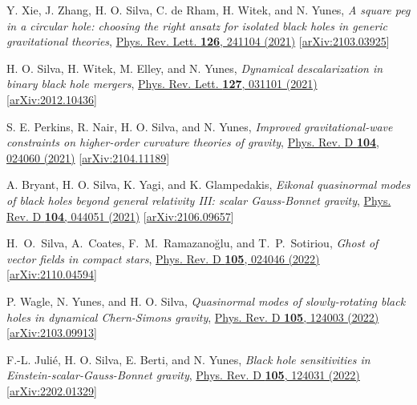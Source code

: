 \documentclass[10pt]{article}
\begin{document}
\begin{bibenum}
    \item Y. Xie, J. Zhang, H. O. Silva, C. de Rham, H. Witek, and N. Yunes,
    \emph{A square peg in a circular hole: choosing the right ansatz for isolated black holes in generic gravitational theories},
    \href{https://journals.aps.org/prl/abstract/10.1103/PhysRevLett.126.241104}{Phys. Rev. Lett. {\bf 126}, 241104 (2021)}
    [\href{https://arxiv.org/abs/2103.03925}{arXiv:2103.03925}]

    \item H. O. Silva, H. Witek, M. Elley, and N. Yunes,
    \emph{Dynamical descalarization in binary black hole mergers},
    \href{https://journals.aps.org/prl/abstract/10.1103/PhysRevLett.127.031101}{Phys. Rev. Lett. {\bf 127}, 031101 (2021)}
    [\href{https://arxiv.org/abs/2012.10436}{arXiv:2012.10436}]

    \item S. E. Perkins, R. Nair, H. O. Silva, and N. Yunes,
    \emph{Improved gravitational-wave constraints on higher-order curvature theories of gravity},
    \href{https://journals.aps.org/prd/abstract/10.1103/PhysRevD.104.024060}{Phys. Rev. D {\bf 104}, 024060 (2021)}
    [\href{https://arxiv.org/abs/2104.11189}{arXiv:2104.11189}]

    \item A. Bryant, H. O. Silva, K. Yagi, and K. Glampedakis,
    \emph{Eikonal quasinormal modes of black holes beyond general relativity III: scalar Gauss-Bonnet gravity},
    \href{https://journals.aps.org/prd/abstract/10.1103/PhysRevD.104.044051}{Phys. Rev. D {\bf 104}, 044051 (2021)}
    [\href{https://arxiv.org/abs/2106.09657}{arXiv:2106.09657}]

    \item H.~O.~Silva, A.~Coates, F.~M.~Ramazano\u{g}lu, and T.~P.~Sotiriou,
    \emph{Ghost of vector fields in compact stars},
    \href{https://journals.aps.org/prd/abstract/10.1103/PhysRevD.105.024046}{Phys. Rev. D {\bf 105}, 024046 (2022)}
    [\href{https://arxiv.org/abs/2110.04594}{arXiv:2110.04594}]

    \item P. Wagle, N. Yunes, and H. O. Silva,
    \emph{Quasinormal modes of slowly-rotating black holes in dynamical Chern-Simons gravity},
    \href{https://journals.aps.org/prd/abstract/10.1103/PhysRevD.105.124003}{Phys. Rev. D {\bf 105}, 124003 (2022)}
    [\href{https://arxiv.org/abs/2103.09913}{arXiv:2103.09913}]

    \item F.-L. Juli\'e, H. O. Silva, E. Berti, and N. Yunes,
    \emph{Black hole sensitivities in Einstein-scalar-Gauss-Bonnet gravity},
    \href{https://journals.aps.org/prd/abstract/10.1103/PhysRevD.105.124031}{Phys. Rev. D {\bf 105}, 124031 (2022)}
    [\href{https://arxiv.org/abs/2202.01329}{arXiv:2202.01329}]


\end{bibenum}
\end{document}
